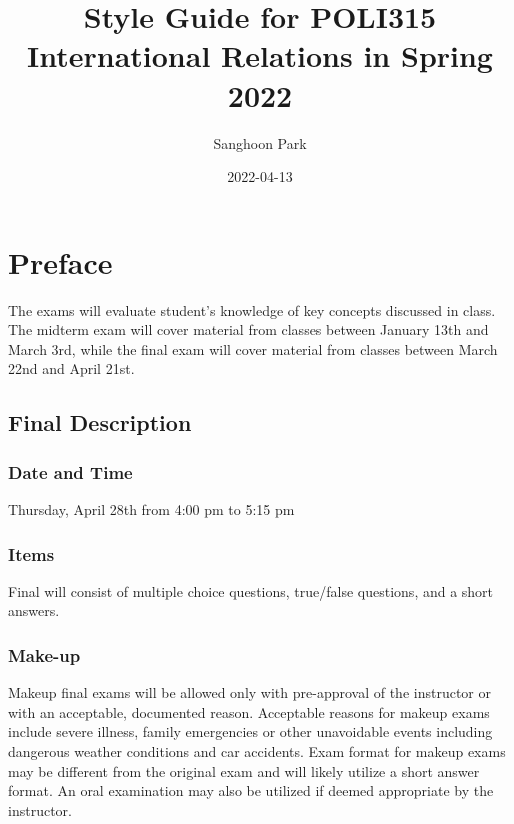 \documentclass[
]{book}
\title{Style Guide for POLI315 International Relations in Spring 2022}
\author{Sanghoon Park}
\date{2022-04-13}
\begin{document}
\maketitle

{
\setcounter{tocdepth}{1}
\tableofcontents
}
\hypertarget{preface}{%
\chapter*{Preface}\label{preface}}

The exams will evaluate student's knowledge of key concepts discussed in class. The midterm exam will cover material from classes between January 13th and March 3rd, while the final exam will cover material from classes between March 22nd and April 21st.

\hypertarget{final-description}{%
\section*{Final Description}\label{final-description}}

\hypertarget{date-and-time}{%
\subsection*{Date and Time}\label{date-and-time}}

Thursday, April 28th from 4:00 pm to 5:15 pm

\hypertarget{items}{%
\subsection*{Items}\label{items}}

Final will consist of multiple choice questions, true/false questions, and a short answers.

\hypertarget{make-up}{%
\subsection*{Make-up}\label{make-up}}

Makeup final exams will be allowed only with pre-approval of the instructor or with an acceptable, documented reason. Acceptable reasons for makeup exams include severe illness, family emergencies or other unavoidable events including dangerous weather conditions and car accidents. Exam format for makeup exams may be different from the original exam and will likely utilize a short answer format. An oral examination may also be utilized if deemed appropriate by the instructor.
\end{document}
